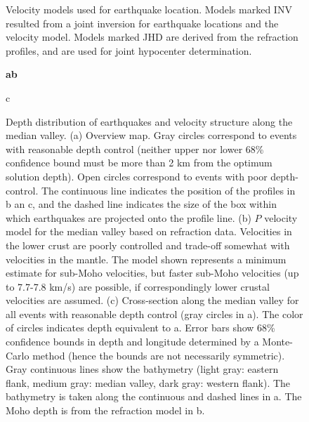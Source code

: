 \documentclass[jgr]{agu2001}
\renewcommand{\includefig}[2]{}
\begin{document}
\begin{figure}
\includefig{velmod/velmod}{20pc}%
\caption{Velocity models used for earthquake location.  Models marked
INV resulted from a joint inversion for earthquake locations and the
velocity model. Models marked JHD are derived from the refraction
profiles, and are used for joint hypocenter determination.}
\label{fig:velmod}
\end{figure}



\begin{figure}
\large \sf \bf a\hspace{17pc}b

\includefig{depth-map/depth-map-ns}{17pc} \includefig{mv-profile/mv-profile-bw-new}{22pc}%

\begin{flushleft}c\end{flushleft}

\includefig{cros/cros-ns}{39pc}%

\caption{Depth distribution of earthquakes and velocity structure
along the median valley. 
(a) Overview map.  Gray  circles correspond to
events with reasonable depth control (neither upper nor lower 68\% confidence
bound must be more than 2 km from the optimum solution depth). Open circles correspond
to events with poor depth-control. The continuous line indicates the position
of the profiles in b an c, and the dashed line indicates the size of
the box within which earthquakes are projected onto the profile line.
 (b) $P$ velocity model for the median valley based on
refraction data. Velocities in the lower crust are poorly controlled
and trade-off somewhat with velocities in the mantle.  The model shown
represents a minimum estimate for
sub-Moho velocities, but faster sub-Moho velocities (up to 7.7-7.8
km/s) are possible, if correspondingly lower crustal velocities are
assumed.
(c) Cross-section along the median valley for all events with
reasonable depth control (gray circles in a). The color of circles
indicates depth equivalent to a. Error bars show
68\% confidence bounds in depth and longitude determined by a
Monte-Carlo method (hence the bounds are not necessarily symmetric). 
Gray continuous lines show the bathymetry (light gray: eastern flank,
medium gray: median valley, dark gray: western flank). The bathymetry
is taken along the continuous and dashed lines in a. The Moho depth is
from the refraction model in b.}
\label{fig:croslon}
\end{figure}
\end{document}
